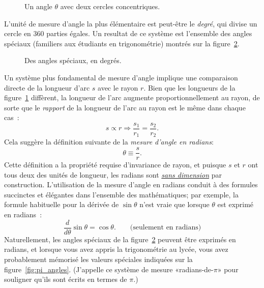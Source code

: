\begin{figure}
\begin{center}
\end{center}
\caption{Un angle $\theta$ avec deux cercles
concentriques.\label{fig:angle_arclength}}
\end{figure}

L'unité de mesure d'angle la plus élémentaire est peut-être le \emph{degré}, qui
divise un cercle en 360 parties égales. Un resultat de ce système est
l'ensemble des angles spéciaux (familiers aux étudiants en trigonométrie)
montrés sur la figure~\ref{fig:degree_angles}.

\begin{figure}
\begin{center}
\end{center}
\caption{Des angles spéciaux, en degrés.\label{fig:degree_angles}}
\end{figure}

Un système plus fondamental de mesure d'angle implique une comparaison directe
de la longueur d'arc $s$ avec le rayon $r$. Bien que les longueurs de la
figure~\ref{fig:angle_arclength} diffèrent, la longueur de l'arc augmente
proportionnellement au rayon, de sorte que le \emph{rapport} de la longueur de
l'arc au rayon est le même dans chaque cas~:
\[
s\propto r \Rightarrow \frac{s_1}{r_1} = \frac{s_2}{r_2}.
\]
Cela suggère la définition suivante de la \emph{mesure d'angle en radians}:
\begin{equation}
\label{eq:radians}
\theta \equiv \frac{s}{r}.
\end{equation}
Cette définition a la propriété requise d'invariance de rayon, et puisque $s$ et
$r$ ont tous deux des unités de longueur, les radians sont
\href{https://fr.wikipedia.org/wiki/Grandeur_sans_dimension}{\emph{sans
dimension}} par construction. L'utilisation de la mesure d'angle en radians conduit
à des formules succinctes et élégantes dans l'ensemble des mathématiques\ns; par
exemple, la formule habituelle pour la dérivée de $\sin\theta$ n'est vraie que
lorsque $\theta$ est exprimé en radians~:
\[
  \frac{d}{d\theta}\sin\theta = \cos\theta. \qquad\mbox{(seulement en radians)}
\]
Naturellement, les angles spéciaux de la figure~\ref{fig:degree_angles} peuvent
être exprimés en radians, et lorsque vous avez appris la trigonométrie au lycée, vous
avez probablement mémorisé les valeurs spéciales indiquées sur la
figure~\ref{fig:pi_angles}. (J'appelle ce système de mesure
«\ns radians-de-$\pi$\ns » pour souligner qu'ils sont écrits en termes de $\pi$.)

